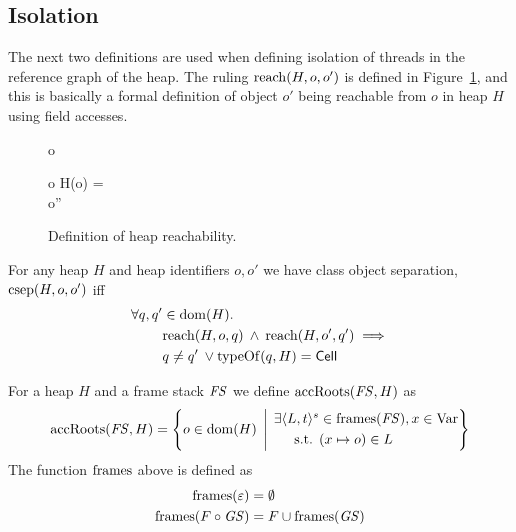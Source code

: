 \subsection{Isolation}%
\label{sub:isolation}

The next two definitions are used when defining isolation of threads in the
reference graph of the heap. The ruling $\mbox{$\mathrm{reach}$}(H, o, o')$ is defined in
Figure~\ref{fig:def_reach}, and this is basically a formal definition of object
$o'$ being reachable from $o$ in heap $H$ using field accesses.

\begin{figure}
  {o \in {}}
  {}

  \RuleSpace{}

  {
    o \in {} \andalso H(o) =  \\
    o'' \in \codom{(\FM)} \andalso {}
  }
  {  }
  \caption{Definition of heap reachability.}
  \label{fig:def_reach}
\end{figure}

\begin{definition}
  For any heap $H$ and heap identifiers $o, o'$ we have class object separation,
  $\mbox{$\mathrm{csep}$}{(H, o, o')}$ iff
  \begin{align}
    \label{eq:csep_def}
    \forall q, q' &\in \mbox{$\mathrm{dom}$}{(H)}. \notag\\
    & \mbox{$\mathrm{reach}$}{(H, o, q)} \: \land \: \mbox{$\mathrm{reach}$}{(H, o', q')} \implies \notag\\ 
    &q \neq q' \: \lor \mbox{$\mathrm{typeOf}$}{(q, H)} = \mbox{$\mathsf{Cell}$}
  \end{align}
\end{definition}

\begin{definition}
  For a heap $H$ and a frame stack $\mathit{FS}$ we define $\mbox{$\mathrm{accRoots}$}{(\ensuremath{\mathit{FS}}, H)}$ as
  \begin{equation*}
    \mbox{$\mathrm{accRoots}$}{(\ensuremath{\mathit{FS}}, H)} = \left\{ o \in \mbox{$\mathrm{dom}$}{(H)} \:\: \middle| \:\:
    \begin{aligned}
      \exists \mbox{$\langle L, t \rangle^s$} &\in \mbox{$\mathrm{frames}$}(\mathit{FS}), x \in \mathrm{Var}  \\
         \text{s.t. } & (x \mapsto o) \in L
    \end{aligned}
    \right\}
  \end{equation*}
  The function $\mbox{$\mathrm{frames}$}$ above is defined as 
  \begin{equation*}
    \begin{aligned}
      \mbox{$\mathrm{frames}$}(\varepsilon) &= \emptyset \\
      \mbox{$\mathrm{frames}$}(F \circ \mathit{GS}) &= F \cup \mbox{$\mathrm{frames}$}(\mathit{GS})
    \end{aligned}
  \end{equation*}
\end{definition}

